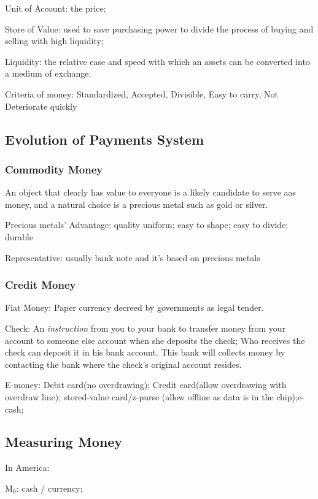 \documentclass[10pt, a4paper]{article}
\begin{document}
        Unit of Account: the price;  
        
        Store of Value: used to save purchasing power to divide the process of buying and selling with high liquidity;
        
        Liquidity: the relative ease and speed with which an assets can be converted into a medium of exchange.

        Criteria of money: Standardized, Accepted, Divisible, Easy to carry, Not Deteriorate quickly

    \subsection{Evolution of Payments System}
        \subsubsection{Commodity Money}
            An object that clearly has value to everyone is a likely candidate to serve aas money, and a natural choice is a precious metal such as gold or silver. 

            Precious metals' Advantage: quality uniform; easy to shape; easy to divide; durable 

            Representative: usually bank note and it's based on precious metals

        \subsubsection{Credit Money}
            Fiat Money: Paper currency decreed by governments as legal tender.  
            
            Check: An \emph{instruction} from you to your bank to transfer money from your account to someone else account when she deposits the check; Who receives the check can deposit it in his bank account. This bank will collects money by contacting the bank where the check's original account resides. 

            E-money: Debit card(no overdrawing); Credit card(allow overdrawing with overdraw line); stored-value card/z-purse (allow offline as data is in the chip);e-cash; 
    \subsection{Measuring Money}
        In America: 

        \quad $\text{M}_0$: cash / currency; 
        
\end{document}
